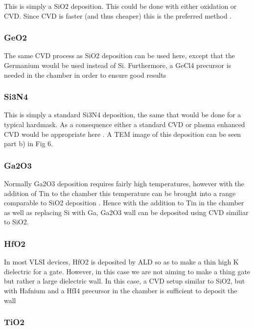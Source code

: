 \documentclass[letterpaper, 12 pt, conference]{ieeeconf}  %
\begin{document}
This is simply a SiO2 deposition. This could be done with either oxidation or CVD. Since CVD is faster (and thus cheaper) this is the preferred method \cite{c14}. 

\subsubsection{GeO2}

The same CVD process as SiO2 deposition can be used here, except that the Germanium would be used instead of Si. Furthermore, a GeCl4 precursor is needed in the chamber in order to ensure good results \cite{c16}

\subsubsection{Si3N4}

This is simply a standard Si3N4 deposition, the same that would be done for a typical hardmask. As a consequence either a standard CVD or plasma enhanced CVD would be appropriate here \cite{c14}. A TEM image of this deposition can be seen part b) in Fig 6. 

\subsubsection{Ga2O3}

Normally Ga2O3 deposition requires fairly high temperatures, however with the addition of Tin to the chamber this temperature can be brought into a range comparable to SiO2 deposition \cite{c7}. Hence with the addition to Tin in the chamber as well as replacing Si with Ga, Ga2O3 wall can be deposited using CVD similiar to SiO2.

\subsubsection{HfO2}

In most VLSI devices, HfO2 is deposited by ALD so as to make a thin high K dielectric for a gate. However, in this case we are not aiming to make a thing gate but rather a large dielectric wall. In this case, a CVD setup similar to SiO2, but with Hafnium and a HfI4 precursor in the chamber is sufficient to deposit the wall \cite{c17}

\subsubsection{TiO2}
\end{document}
